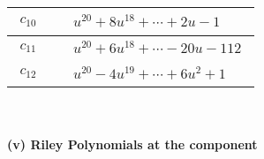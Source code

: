 \documentclass[1p]{elsarticle_modified}
\theoremstyle{definition}
\begin{document}
\begin{tabular}{m{50pt}|m{274pt}}
\hline $$\begin{aligned}c_{10}\end{aligned}$$&$\begin{aligned}
&u^{20}+8 u^{18}+\cdots+2 u-1
\end{aligned}$\\
\hline $$\begin{aligned}c_{11}\end{aligned}$$&$\begin{aligned}
&u^{20}+6 u^{18}+\cdots-20 u-112
\end{aligned}$\\
\hline $$\begin{aligned}c_{12}\end{aligned}$$&$\begin{aligned}
&u^{20}-4 u^{19}+\cdots+6 u^2+1
\end{aligned}$\\
\hline
\end{tabular}\\~\\
\newpage\renewcommand{\arraystretch}{1}
\flushleft \textbf{(v) Riley Polynomials at the component}\newline \\
\end{document}
